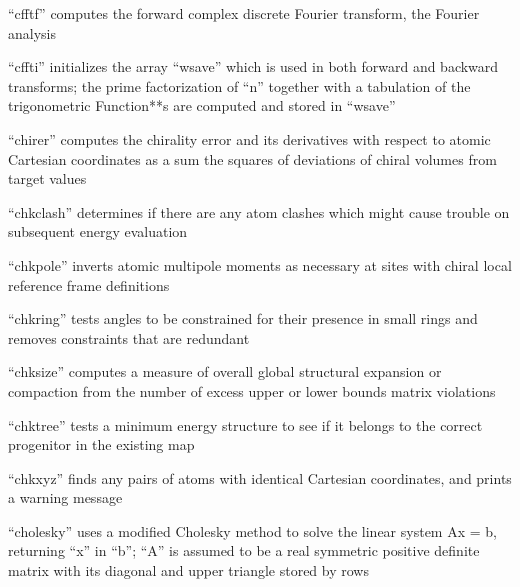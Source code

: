 \documentclass[letterpaper,11pt,english]{sphinxmanual}
\begin{document}

“cfftf” computes the forward complex discrete Fourier transform, the Fourier analysis



“cffti” initializes the array “wsave” which is used in both forward and backward transforms; the prime factorization of “n” together with a tabulation of the trigonometric Function**s are computed and stored in “wsave”



“chirer” computes the chirality error and its derivatives with respect to atomic Cartesian coordinates as a sum the squares of deviations of chiral volumes from target values


“chkclash” determines if there are any atom clashes which might cause trouble on subsequent energy evaluation


“chkpole” inverts atomic multipole moments as necessary at sites with chiral local reference frame definitions


“chkring” tests angles to be constrained for their presence in small rings and removes constraints that are redundant


“chksize” computes a measure of overall global structural expansion or compaction from the number of excess upper or lower bounds matrix violations


“chktree” tests a minimum energy structure to see if it belongs to the correct progenitor in the existing map


“chkxyz” finds any pairs of atoms with identical Cartesian coordinates, and prints a warning message


“cholesky” uses a modified Cholesky method to solve the linear system Ax = b, returning “x” in “b”; “A” is assumed to be a real symmetric positive definite matrix with its diagonal and upper triangle stored by rows
\end{document}
